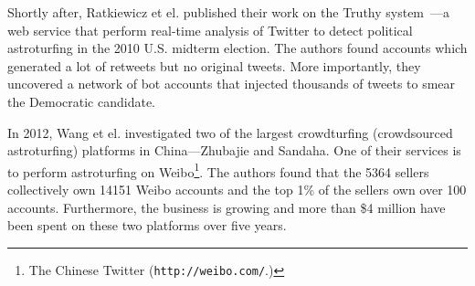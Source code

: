 \begin{comment}
In the 2010 Massachusetts senate race, Mustafaraj and Metaxas found evidence
that Republican campaigners created fake Twitter accounts and used them to send
spam. The spam caused Google real-time search results to tip in their favour
thus causing a spread of misinformation~\cite{mustafaraj2010obscurity}.
Ratkiewicz et el. suggest that this type of attack can be mounted cheaply and
may have a larger influence than traditional
advertising~\cite{ratkiewicz2011truthy}.
\end{comment}

Shortly after, Ratkiewicz et el. published their work on the Truthy
system~\cite{ratkiewicz2011truthy}---a web service that perform real-time
analysis of Twitter to detect political astroturfing in the 2010 U.S. midterm
election. The authors found accounts which generated a lot of retweets but no
original tweets. More importantly, they uncovered a network of bot accounts that
injected thousands of tweets to smear the Democratic candidate.

In 2012, Wang et el. investigated two of the largest crowdturfing (crowdsourced
astroturfing) platforms in China---Zhubajie and Sandaha. One of their services
is to perform astroturfing on Weibo\footnote{The Chinese Twitter
  (\texttt{http://weibo.com/}.)}. The authors found that the 5364 sellers
collectively own 14151 Weibo accounts and the top 1\% of the sellers own over
100 accounts. Furthermore, the business is growing and more than \$4 million
have been spent on these two platforms over five years\cite{wang2012serf}.

